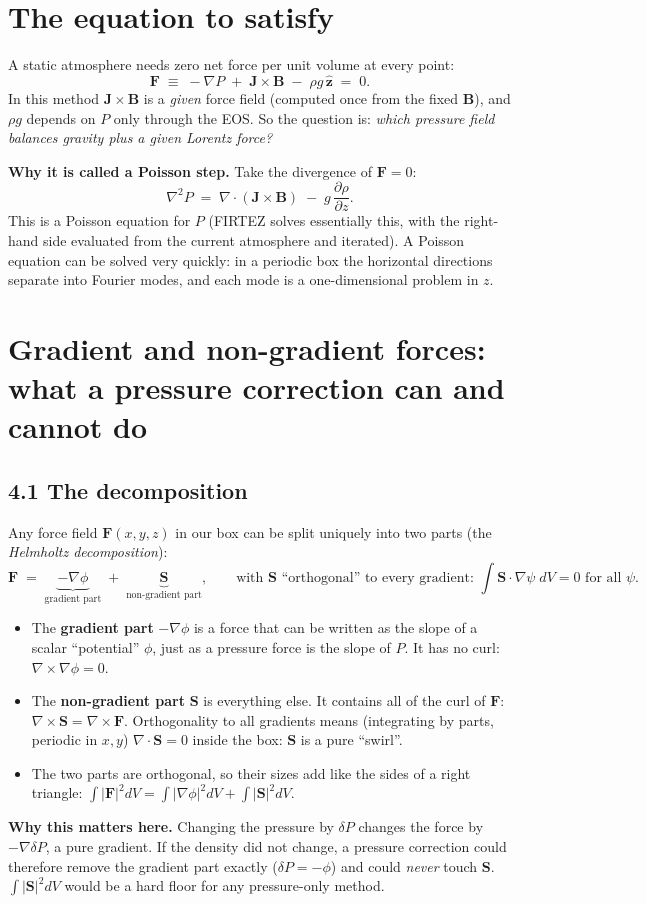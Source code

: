 \documentclass[10pt]{extarticle}
\newcommand{\B}{\mathbf B}\newcommand{\J}{\mathbf J}\newcommand{\F}{\mathbf F}\newcommand{\zh}{\hat{\mathbf z}}
\begin{document}
\section{The equation to satisfy}
A static atmosphere needs zero net force per unit volume at every point:
\[
\F \;\equiv\; -\nabla P \;+\; \J\times\B \;-\; \rho g\,\zh \;=\; 0 .
\]
In this method $\J\times\B$ is a \emph{given} force field (computed once from the fixed $\B$), and $\rho g$ depends on $P$
only through the EOS. So the question is: \emph{which pressure field balances gravity plus a given Lorentz force?}

\textbf{Why it is called a Poisson step.} Take the divergence of $\F=0$:
\[
\nabla^2 P \;=\; \nabla\!\cdot(\J\times\B) \;-\; g\,\frac{\partial\rho}{\partial z}.
\]
This is a Poisson equation for $P$ (FIRTEZ solves essentially this, with the right-hand side evaluated from the current
atmosphere and iterated). A Poisson equation can be solved very quickly: in a periodic box the horizontal directions
separate into Fourier modes, and each mode is a one-dimensional problem in $z$.

\section{Gradient and non-gradient forces: what a pressure correction can and cannot do}

\subsection*{4.1 The decomposition}
Any force field $\F(x,y,z)$ in our box can be split uniquely into two parts (the \emph{Helmholtz decomposition}):
\[
\F \;=\; \underbrace{-\nabla\phi}_{\text{gradient part}} \;+\; \underbrace{\mathbf S}_{\text{non-gradient part}},
\qquad\text{with } \mathbf S \text{ ``orthogonal'' to every gradient: } \int \mathbf S\cdot\nabla\psi\;dV=0 \text{ for all } \psi .
\]
\begin{itemize}
\item The \textbf{gradient part} $-\nabla\phi$ is a force that can be written as the slope of a scalar ``potential''
$\phi$, just as a pressure force is the slope of $P$. It has no curl: $\nabla\times\nabla\phi=0$.
\item The \textbf{non-gradient part} $\mathbf S$ is everything else. It contains all of the curl of $\F$:
$\nabla\times\mathbf S=\nabla\times\F$. Orthogonality to all gradients means (integrating by parts, periodic in $x,y$)
$\nabla\cdot\mathbf S=0$ inside the box: $\mathbf S$ is a pure ``swirl''.
\item The two parts are orthogonal, so their sizes add like the sides of a right triangle:
$\int|\F|^2dV=\int|\nabla\phi|^2dV+\int|\mathbf S|^2dV$.
\end{itemize}
\textbf{Why this matters here.} Changing the pressure by $\delta P$ changes the force by $-\nabla\delta P$, a pure gradient.
If the density did not change, a pressure correction could therefore remove the gradient part exactly ($\delta P=-\phi$)
and could \emph{never} touch $\mathbf S$. $\int|\mathbf S|^2dV$ would be a hard floor for any pressure-only method.
\end{document}

